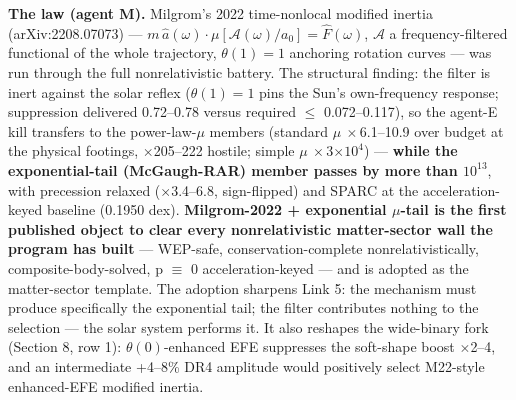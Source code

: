 \documentclass[11pt,a4paper]{article}
\begin{document}
\textbf{The law (agent M).} Milgrom's 2022 time-nonlocal modified inertia (arXiv:2208.07073) --- $m\,\hat a(\omega)\cdot\mu[\mathcal{A}(\omega)/a_0] = \hat F(\omega)$, $\mathcal{A}$ a frequency-filtered functional of the whole trajectory, $\theta(1) = 1$ anchoring rotation curves --- was run through the full nonrelativistic battery. The structural finding: the filter is inert against the solar reflex ($\theta(1) = 1$ pins the Sun's own-frequency response; suppression delivered 0.72--0.78 versus required $\le$ 0.072--0.117), so the agent-E kill transfers to the power-law-$\mu$ members (standard $\mu\ \times$6.1--10.9 over budget at the physical footings, $\times$205--222 hostile; simple $\mu\ \times$3$\times10^{4}$) --- \textbf{while the exponential-tail (McGaugh-RAR) member passes by more than $10^{13}$}, with precession relaxed ($\times$3.4--6.8, sign-flipped) and SPARC at the acceleration-keyed baseline (0.1950 dex). \textbf{Milgrom-2022 + exponential $\mu$-tail is the first published object to clear every nonrelativistic matter-sector wall the program has built} --- WEP-safe, conservation-complete nonrelativistically, composite-body-solved, p $\equiv$ 0 acceleration-keyed --- and is adopted as the matter-sector template. The adoption sharpens Link 5: the mechanism must produce specifically the exponential tail; the filter contributes nothing to the selection --- the solar system performs it. It also reshapes the wide-binary fork (Section 8, row 1): $\theta(0)$-enhanced EFE suppresses the soft-shape boost $\times$2--4, and an intermediate +4--8\% DR4 amplitude would positively select M22-style enhanced-EFE modified inertia.
\end{document}
